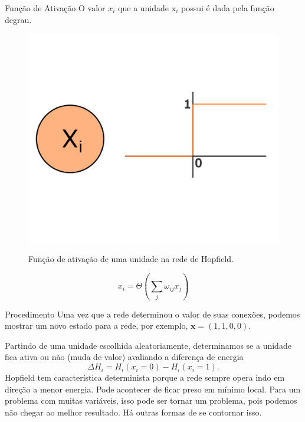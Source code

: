 \begin{frame}{Função de Ativação}%
  \justifying%
 O valor $x_{i}$ que a unidade $\mathrm{x}_{i}$ possui é dada pela função degrau.
  \begin{figure}[h]{}%
    \label{fig:hopfield-step}%
    \includegraphics[scale=0.35]{images/hopfield_activation.png}
    \caption{Função de ativação de uma unidade na rede de Hopfield.}
  \end{figure}
  \begin{equation}%
    \label{eq:step-function}
    x_{i} = \Theta \left(\sum_{j} \omega_{ij} x_{j} \right)
  \end{equation}
\end{frame}

\begin{frame}{Procedimento}%
  \justifying%
  Uma vez que a rede determinou o valor de suas conexões, podemos mostrar um novo estado para a rede, por exemplo, $\mathrm{\mathbf{x}} = (1, 1, 0, 0)$.
  
  Partindo de uma unidade escolhida aleatoriamente, determinamos se a unidade fica ativa ou não (muda de valor) avaliando a diferença de energia 
  \begin{equation}%
    \label{eq:energy-delta}%
    \Delta H_{i} = H_{i}(x_{i} = 0) - H_{i}(x_{i} = 1). 
  \end{equation}
  Hopfield tem característica determinista porque a rede sempre opera indo em direção a menor energia. Pode acontecer de ficar preso em mínimo local. Para um problema com muitas variáveis, isso pode ser tornar um problema, pois podemos não chegar ao melhor resultado. Há outras formas de se contornar isso.
\end{frame}
